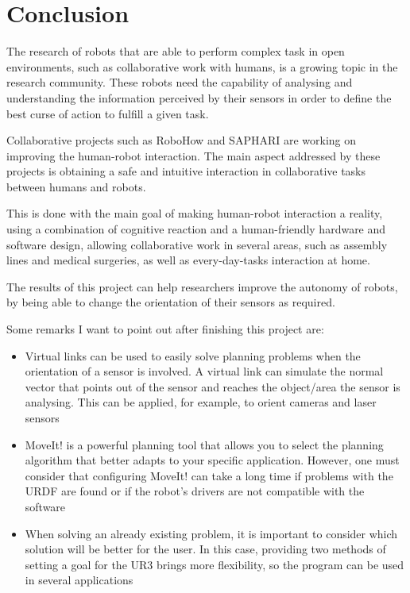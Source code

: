 

\chapter{Conclusion}
The research of robots that are able to perform complex task in open environments, such as collaborative work with humans, is a growing topic in the research community. These robots need the capability of analysing and understanding the information perceived by their sensors in order to define the best curse of action to fulfill a given task.

Collaborative projects such as RoboHow and SAPHARI are working on improving the human-robot interaction. The main aspect addressed by these projects is obtaining a safe and intuitive interaction in collaborative tasks between humans and robots.

This is done with the main goal of making human-robot interaction a reality, using a combination of cognitive reaction and a human-friendly hardware and software design, allowing collaborative work in several areas, such as assembly lines and medical surgeries, as well as every-day-tasks interaction at home.

The results of this project can help researchers improve the autonomy of robots, by being able to change the orientation of their sensors as required.

Some remarks I want to point out after finishing this project are:
\begin{itemize}
	\item Virtual links can be used to easily solve planning problems when the orientation of a sensor is involved. A virtual link can simulate the normal vector that points out of the sensor and reaches the object/area the sensor is analysing. This can be applied, for example, to orient cameras and laser sensors
	\item MoveIt! is a powerful planning tool that allows you to select the planning algorithm that better adapts to your specific application. However, one must consider that configuring MoveIt! can take a long time if problems with the URDF are found or if the robot's drivers are not compatible with the software
	\item When solving an already existing problem, it is important to consider which solution will be better for the user. In this case, providing two methods of setting a goal for the UR3 brings more flexibility, so the program can be used in several applications
\end{itemize}

